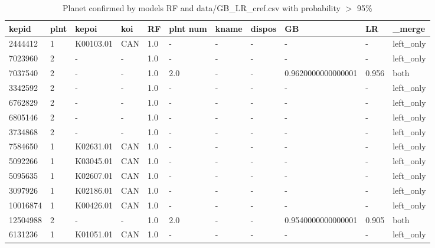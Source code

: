 \begin{table}[!htbp]
 \centering
 \caption{Planet confirmed by models RF and data/GB\_LR\_cref.csv with probability $>$ 95\%}
 \label{dataRFGBLRcreftab} 
  \begin{tabular}
{| 
 p{}| 
 p{}| 
 p{}| 
 p{}| 
 p{}| 
 p{}| 
 p{}| 
 p{}| 
 p{}| 
 p{}| 
 p{}| 
}\hline 
\textbf{kepid} &\textbf{plnt} &\textbf{kepoi} &\textbf{koi} &\textbf{RF} &\textbf{plnt num} &\textbf{kname} &\textbf{dispos} &\textbf{GB} &\textbf{LR} &\textbf{\_merge} \\ \hline 
2444412 &1 &K00103.01 &CAN &1.0 &- &- &- &- &- &left\_only \\ \hline 
7023960 &2 &- &- &1.0 &- &- &- &- &- &left\_only \\ \hline 
7037540 &2 &- &- &1.0 &2.0 &- &- &0.9620000000000001 &0.956 &both \\ \hline 
3342592 &2 &- &- &1.0 &- &- &- &- &- &left\_only \\ \hline 
6762829 &2 &- &- &1.0 &- &- &- &- &- &left\_only \\ \hline 
6805146 &2 &- &- &1.0 &- &- &- &- &- &left\_only \\ \hline 
3734868 &2 &- &- &1.0 &- &- &- &- &- &left\_only \\ \hline 
7584650 &1 &K02631.01 &CAN &1.0 &- &- &- &- &- &left\_only \\ \hline 
5092266 &1 &K03045.01 &CAN &1.0 &- &- &- &- &- &left\_only \\ \hline 
5095635 &1 &K02607.01 &CAN &1.0 &- &- &- &- &- &left\_only \\ \hline 
3097926 &1 &K02186.01 &CAN &1.0 &- &- &- &- &- &left\_only \\ \hline 
10016874 &1 &K00426.01 &CAN &1.0 &- &- &- &- &- &left\_only \\ \hline 
12504988 &2 &- &- &1.0 &2.0 &- &- &0.9540000000000001 &0.905 &both \\ \hline 
6131236 &1 &K01051.01 &CAN &1.0 &- &- &- &- &- &left\_only \\ \hline 

\end{tabular}
\end{table}
